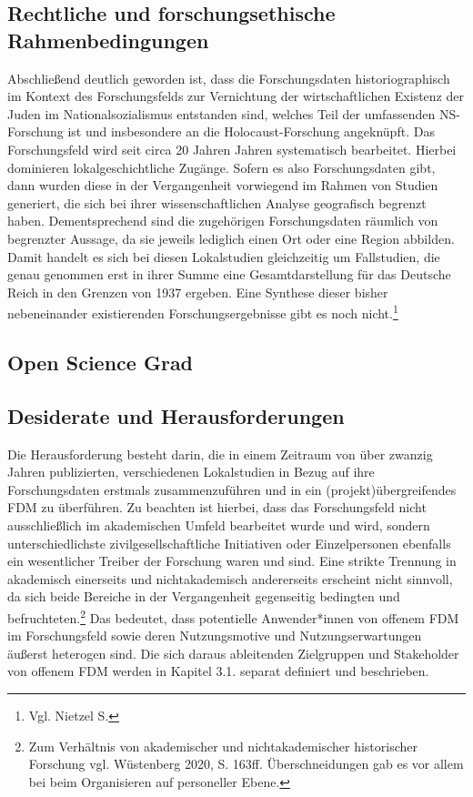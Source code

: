 \subsection{Rechtliche und forschungsethische Rahmenbedingungen}
Abschließend deutlich geworden ist, dass die Forschungsdaten historiographisch im Kontext des Forschungsfelds zur Vernichtung der wirtschaftlichen Existenz der Juden im Nationalsozialismus entstanden sind, welches Teil der umfassenden NS-Forschung ist und insbesondere an die Holocaust-Forschung angeknüpft. Das Forschungsfeld wird seit circa 20 Jahren Jahren systematisch bearbeitet. Hierbei dominieren lokalgeschichtliche Zugänge. Sofern es also Forschungsdaten gibt, dann wurden diese in der Vergangenheit vorwiegend im Rahmen von Studien generiert, die sich bei ihrer wissenschaftlichen Analyse geografisch begrenzt haben. Dementsprechend sind die zugehörigen Forschungsdaten räumlich von begrenzter Aussage, da sie jeweils lediglich einen Ort oder eine Region abbilden. Damit handelt es sich bei diesen Lokalstudien gleichzeitig um Fallstudien, die genau genommen erst in ihrer Summe eine Gesamtdarstellung für das Deutsche Reich in den Grenzen von 1937 ergeben. Eine Synthese dieser bisher nebeneinander existierenden Forschungsergebnisse gibt es noch nicht.\footnote{Vgl. Nietzel S.}

\subsection{Open Science Grad}

\subsection{Desiderate und Herausforderungen}
Die Herausforderung besteht darin, die in einem Zeitraum von über zwanzig Jahren publizierten, verschiedenen Lokalstudien in Bezug auf ihre Forschungsdaten erstmals zusammenzuführen und in ein (projekt)übergreifendes FDM zu überführen. Zu beachten ist hierbei, dass das Forschungsfeld nicht ausschließlich im akademischen Umfeld bearbeitet wurde und wird, sondern unterschiedlichste zivilgesellschaftliche Initiativen oder Einzelpersonen ebenfalls ein wesentlicher Treiber der Forschung waren und sind. Eine strikte Trennung in akademisch einerseits und nichtakademisch andererseits erscheint nicht sinnvoll, da sich beide Bereiche in der Vergangenheit gegenseitig bedingten und befruchteten.\footnote{Zum Verhältnis von akademischer und nichtakademischer historischer Forschung vgl. Wüstenberg 2020, S. 163ff. Überschneidungen gab es vor allem bei beim Organisieren auf personeller Ebene.} Das bedeutet, dass potentielle Anwender*innen von offenem FDM im Forschungsfeld sowie deren Nutzungsmotive und Nutzungserwartungen äußerst heterogen sind. Die sich daraus ableitenden Zielgruppen und Stakeholder von offenem FDM werden in Kapitel 3.1. separat definiert und beschrieben.

